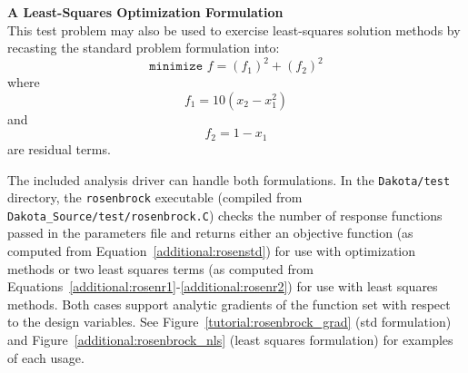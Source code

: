 {\bf A Least-Squares Optimization Formulation} \\
This test problem
may also be used to exercise least-squares solution methods by
recasting the standard problem formulation into:
\begin{equation}
\texttt{minimize } f = (f_1)^2+(f_2)^2 \label{additional:rosenls}
\end{equation}
where
\begin{equation}
f_1 = 10 (x_2 - x_1^2) \label{additional:rosenr1}
\end{equation}
and
\begin{equation}
f_2 = 1 - x_1 \label{additional:rosenr2}
\end{equation}
are residual terms.

The included analysis driver can handle both formulations.
In the \texttt{Dakota/test} directory, the \texttt{rosenbrock}
executable (compiled from \texttt{Dakota\_Source/test/rosenbrock.C}) checks the number of
response functions passed in the parameters file and returns either an
objective function (as computed from
Equation~\ref{additional:rosenstd}) for use with optimization methods
or two least squares terms (as computed from
Equations~\ref{additional:rosenr1}-\ref{additional:rosenr2}) for use
with least squares methods. Both cases support analytic gradients of
the function set with respect to the design variables.
See Figure~\ref{tutorial:rosenbrock_grad} (std formulation) 
and Figure~\ref{additional:rosenbrock_nls} (least squares formulation)
for examples of each usage.


